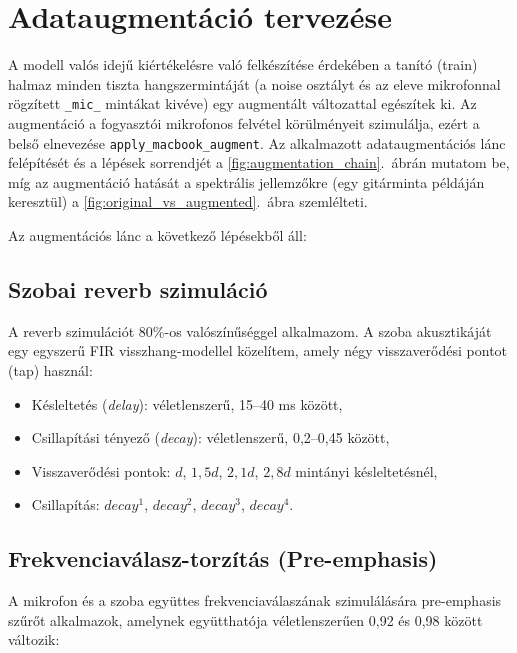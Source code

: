 \section{Adataugmentáció tervezése}
\label{sec:augmentation}

A modell valós idejű kiértékelésre való felkészítése érdekében a tanító (train) halmaz minden tiszta hangszermintáját (a noise osztályt és az eleve mikrofonnal rögzített \texttt{\_mic\_} mintákat kivéve) egy augmentált változattal egészítek ki. Az augmentáció a fogyasztói mikrofonos felvétel körülményeit szimulálja, ezért a belső elnevezése \texttt{apply\_macbook\_\allowbreak augment}. Az alkalmazott adataugmentációs lánc felépítését és a lépések sorrendjét a \ref{fig:augmentation_chain}.~ábrán mutatom be, míg az augmentáció hatását a spektrális jellemzőkre (egy gitárminta példáján keresztül) a \ref{fig:original_vs_augmented}.~ábra szemlélteti.

Az augmentációs lánc a következő lépésekből áll:

\subsection{Szobai reverb szimuláció}
\label{subsec:reverb}

A reverb szimulációt 80\%-os valószínűséggel alkalmazom. A szoba akusztikáját egy egyszerű FIR visszhang-modellel közelítem, amely négy visszaverődési pontot (tap) használ:

\begin{itemize}
  \item Késleltetés (\textit{delay}): véletlenszerű, 15--40 ms között,
  \item Csillapítási tényező (\textit{decay}): véletlenszerű, 0{,}2--0{,}45 között,
  \item Visszaverődési pontok: $d$, $1{,}5d$, $2{,}1d$, $2{,}8d$ mintányi késleltetésnél,
  \item Csillapítás: $decay^1$, $decay^2$, $decay^3$, $decay^4$.
\end{itemize}

\subsection{Frekvenciaválasz-torzítás (Pre-emphasis)}

A mikrofon és a szoba együttes frekvenciaválaszának szimulálására pre-emphasis szűrőt alkalmazok, amelynek együtthatója véletlenszerűen 0{,}92 és 0{,}98 között változik:

